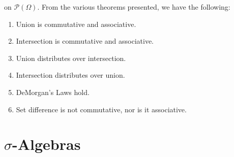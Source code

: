 \documentclass[crop=false,class=book,oneside]{standalone}
\begin{document}
            on $\mathcal{P}(\Omega)$. From the various theorems
            presented, we have the following:
            \begin{enumerate}
                \item Union is commutative and associative.
                \item Intersection is commutative and
                      associative.
                \item Union distributes over intersection.
                \item Intersection distributes over union.
                \item DeMorgan's Laws hold.
                \item Set difference is not commutative,
                      nor is it associative.
            \end{enumerate}
    \section{\texorpdfstring{$\sigma$}{Sigma}-Algebras}
\end{document}
